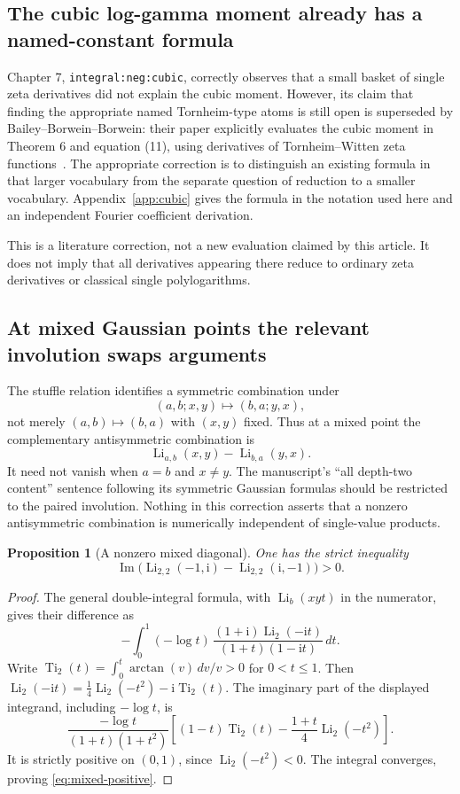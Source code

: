 \documentclass[11pt]{article}
\numberwithin{equation}{section}
\newtheorem{proposition}[theorem]{Proposition}
\theoremstyle{definition}
\theoremstyle{remark}
\DeclareMathOperator{\Li}{Li}
\DeclareMathOperator{\Imm}{Im}
\newcommand{\ii}{\mathrm i}
\newcommand{\code}[1]{\texttt{\small #1}}
\begin{document}
\subsection{The cubic log-gamma moment already has a named-constant formula}
Chapter 7, \code{integral:neg:cubic}, correctly observes that a small
basket of single zeta derivatives did not explain the cubic moment.
However, its claim that finding the appropriate named Tornheim-type
atoms is still open is superseded by Bailey--Borwein--Borwein:
their paper explicitly evaluates the cubic moment in Theorem 6 and
equation (11), using derivatives of Tornheim--Witten zeta
functions~\cite{bbb}. The appropriate correction is to distinguish an
existing formula in that larger vocabulary from the separate question
of reduction to a smaller vocabulary. Appendix~\ref{app:cubic} gives
the formula in the notation used here and an independent Fourier
coefficient derivation.

This is a literature correction, not a new evaluation claimed by this
article. It does not imply that all derivatives appearing there reduce
to ordinary zeta derivatives or classical single polylogarithms.

\subsection{At mixed Gaussian points the relevant involution swaps arguments}
The stuffle relation identifies a symmetric combination under
\[
 (a,b;x,y)\longmapsto(b,a;y,x),
\]
not merely $(a,b)\mapsto(b,a)$ with $(x,y)$ fixed. Thus at a mixed
point the complementary antisymmetric combination is
\[
 \Li_{a,b}(x,y)-\Li_{b,a}(y,x).
\]
It need not vanish when $a=b$ and $x\ne y$. The manuscript's
``all depth-two content'' sentence following its symmetric Gaussian
formulas should be restricted to the paired involution. Nothing in
this correction asserts that a nonzero antisymmetric combination is
numerically independent of single-value products.

\begin{proposition}[A nonzero mixed diagonal]\label{prop:mixed-diagonal}
One has the strict inequality
\begin{equation}\label{eq:mixed-positive}
 \Imm\bigl(\Li_{2,2}(-1,\ii)-\Li_{2,2}(\ii,-1)\bigr)>0.
\end{equation}
\end{proposition}
\begin{proof}
The general double-integral formula, with $\Li_b(xyt)$ in the
numerator, gives their difference as
\[
 -\int_0^1(-\log t)\,
 \frac{(1+\ii)\Li_2(-\ii t)}{(1+t)(1-\ii t)}\,dt.
\]
Write $\operatorname{Ti}_2(t)=\int_0^t\arctan(v)\,dv/v>0$ for
$0<t\le1$. Then
$\Li_2(-\ii t)=\tfrac14\Li_2(-t^2)-\ii\operatorname{Ti}_2(t)$.
The imaginary part of the displayed integrand, including $-\log t$,
is
\[
 \frac{-\log t}{(1+t)(1+t^2)}
 \left[(1-t)\operatorname{Ti}_2(t)
       -\frac{1+t}{4}\Li_2(-t^2)\right].
\]
It is strictly positive on $(0,1)$, since $\Li_2(-t^2)<0$.
The integral converges, proving \eqref{eq:mixed-positive}.
\end{proof}
\end{document}
